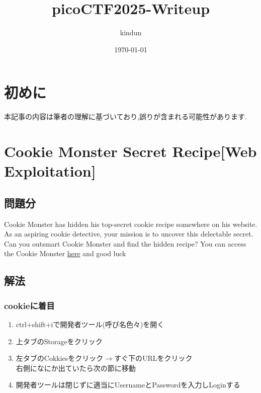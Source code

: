 \documentclass{jsarticle}
\title{picoCTF2025-Writeup}
\author{kindun}
\date{\today}
\begin{document}
\maketitle 

\section{初めに}
本記事の内容は筆者の理解に基づいており,誤りが含まれる可能性があります.

\section{Cookie Monster Secret Recipe[Web Exploitation]}
\subsection{問題分}
Cookie Monster has hidden his top-secret cookie recipe somewhere on his website. As an aspiring cookie detective, your mission is to uncover this delectable secret. Can you outsmart Cookie Monster and find the hidden recipe? You can access the Cookie Monster \href{http://verbal-sleep.picoctf.net:56571/}{here} and good luck

\subsection{解法}
\subsubsection{cookieに着目}
\begin{enumerate}
	\item ctrl+shift+iで開発者ツール(呼び名色々)を開く
	\item 上タブのStorageをクリック
	\item 左タブのCokkiesをクリック$ \xrightarrow{} $すぐ下のURLをクリック\\
	右側になにか出ていたら次の節に移動
	\item 開発者ツールは閉じずに適当にUsernameとPasswordを入力しLoginする
\end{enumerate}
\end{document}
